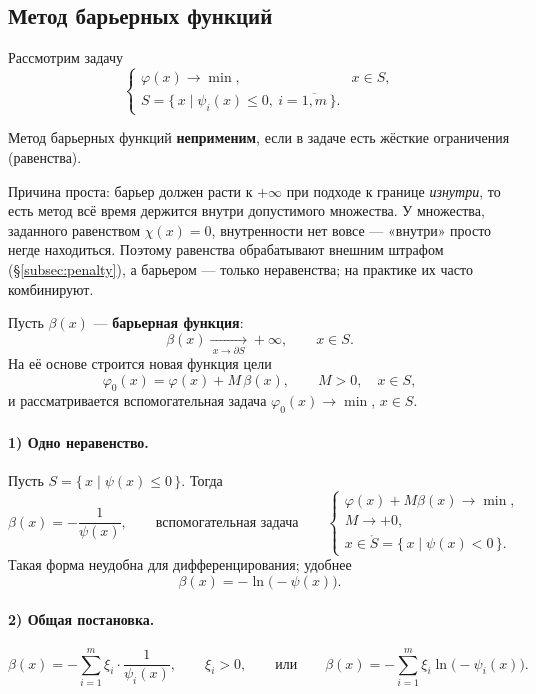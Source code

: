 \subsection{Метод барьерных функций}
\label{subsec:barrier}

Рассмотрим задачу
\[
  \begin{cases}
    \varphi(x) \to \min , & x \in S , \\
    S = \{\, x \mid \psi_i(x) \le 0,\ i = \overline{1,m} \,\} .
  \end{cases}
\]

\begin{remark}
Метод барьерных функций \textbf{неприменим}, если в задаче есть жёсткие
ограничения (равенства).
\end{remark}

\begin{idea}
Причина проста: барьер должен расти к $+\infty$ при подходе к границе
\emph{изнутри}, то есть метод всё время держится внутри допустимого множества.
У множества, заданного равенством $\chi(x) = 0$, внутренности нет вовсе —
«внутри» просто негде находиться. Поэтому равенства обрабатывают внешним
штрафом (\S\ref{subsec:penalty}), а барьером — только неравенства; на практике
их часто комбинируют.
\end{idea}

Пусть $\beta(x)$ — \textbf{барьерная функция}:
\[
  \beta(x) \xrightarrow[\ x \to \partial S\ ]{} +\infty , \qquad x \in S .
\]
На её основе строится новая функция цели
\[
  \varphi_0(x) = \varphi(x) + M\,\beta(x) , \qquad M > 0 , \quad x \in S ,
\]
и рассматривается вспомогательная задача $\varphi_0(x) \to \min$, $x \in S$.

\paragraph{1) Одно неравенство.}
Пусть $S = \{\, x \mid \psi(x) \le 0 \,\}$. Тогда
\[
  \beta(x) = -\frac{1}{\psi(x)} ,
  \qquad\text{вспомогательная задача}\qquad
  \begin{cases}
    \varphi(x) + M\beta(x) \to \min , \\
    M \to +0 , \\
    x \in \mathring{S} = \{\, x \mid \psi(x) < 0 \,\} .
  \end{cases}
\]
Такая форма неудобна для дифференцирования; удобнее
\[
  \beta(x) = -\ln\big(-\psi(x)\big) .
\]

\paragraph{2) Общая постановка.}
\[
  \beta(x) = -\sum_{i=1}^{m} \xi_i \cdot \frac{1}{\psi_i(x)} ,
  \qquad \xi_i > 0 ,
  \qquad\text{или}\qquad
  \beta(x) = -\sum_{i=1}^{m} \xi_i \ln\big(-\psi_i(x)\big) .
\]

